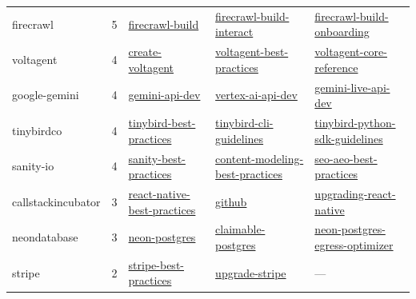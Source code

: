 \documentclass[UTF8,a4paper,12pt]{ctexart}
\begin{document}
\begin{longtable}{p{2.8cm} r p{4.2cm} p{4.2cm} p{4.2cm}}
firecrawl & 5 & \href{https://officialskills.sh/firecrawl/skills/firecrawl-build}{firecrawl-build} & \href{https://officialskills.sh/firecrawl/skills/firecrawl-build-interact}{firecrawl-build-interact} & \href{https://officialskills.sh/firecrawl/skills/firecrawl-build-onboarding}{firecrawl-build-onboarding} \\
voltagent & 4 & \href{https://officialskills.sh/voltagent/skills/create-voltagent}{create-voltagent} & \href{https://officialskills.sh/voltagent/skills/voltagent-best-practices}{voltagent-best-practices} & \href{https://officialskills.sh/voltagent/skills/voltagent-core-reference}{voltagent-core-reference} \\
google-gemini & 4 & \href{https://officialskills.sh/google-gemini/skills/gemini-api-dev}{gemini-api-dev} & \href{https://officialskills.sh/google-gemini/skills/vertex-ai-api-dev}{vertex-ai-api-dev} & \href{https://officialskills.sh/google-gemini/skills/gemini-live-api-dev}{gemini-live-api-dev} \\
tinybirdco & 4 & \href{https://officialskills.sh/tinybirdco/skills/tinybird-best-practices}{tinybird-best-practices} & \href{https://officialskills.sh/tinybirdco/skills/tinybird-cli-guidelines}{tinybird-cli-guidelines} & \href{https://officialskills.sh/tinybirdco/skills/tinybird-python-sdk-guidelines}{tinybird-python-sdk-guidelines} \\
sanity-io & 4 & \href{https://officialskills.sh/sanity-io/skills/sanity-best-practices}{sanity-best-practices} & \href{https://officialskills.sh/sanity-io/skills/content-modeling-best-practices}{content-modeling-best-practices} & \href{https://officialskills.sh/sanity-io/skills/seo-aeo-best-practices}{seo-aeo-best-practices} \\
callstackincubator & 3 & \href{https://officialskills.sh/callstackincubator/skills/react-native-best-practices}{react-native-best-practices} & \href{https://officialskills.sh/callstackincubator/skills/github}{github} & \href{https://officialskills.sh/callstackincubator/skills/upgrading-react-native}{upgrading-react-native} \\
neondatabase & 3 & \href{https://officialskills.sh/neondatabase/skills/neon-postgres}{neon-postgres} & \href{https://officialskills.sh/neondatabase/skills/claimable-postgres}{claimable-postgres} & \href{https://officialskills.sh/neondatabase/skills/neon-postgres-egress-optimizer}{neon-postgres-egress-optimizer} \\
stripe & 2 & \href{https://officialskills.sh/stripe/skills/stripe-best-practices}{stripe-best-practices} & \href{https://officialskills.sh/stripe/skills/upgrade-stripe}{upgrade-stripe} & — \\

\end{longtable}
\end{document}
